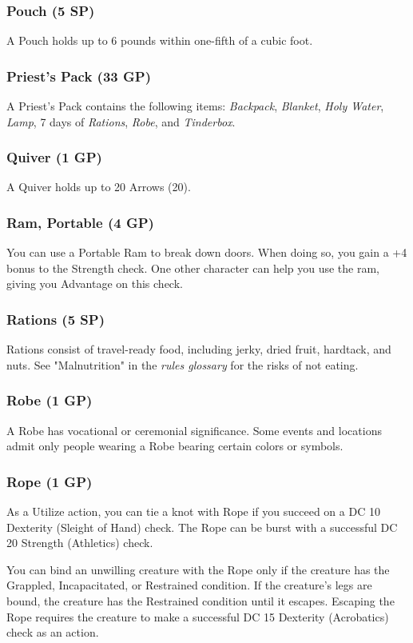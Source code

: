 \documentclass[10pt,a4paper,twoside,bg=print,twocolumn,openany,nodeprecatedcode]{dndbook}
\begin{document}
\subsubsection{Pouch (5 SP)}
A Pouch holds up to 6 pounds within one-fifth of a cubic foot.

\subsubsection{Priest's Pack (33 GP)}
A Priest's Pack contains the following items: \textit{Backpack}, \textit{Blanket}, \textit{Holy Water}, \textit{Lamp}, 7 days of \textit{Rations}, \textit{Robe}, and \textit{Tinderbox}.

\subsubsection{Quiver (1 GP)}
A Quiver holds up to 20 Arrows (20).

\subsubsection{Ram, Portable (4 GP)}
You can use a Portable Ram to break down doors. When doing so, you gain a +4 bonus to the Strength check. One other character can help you use the ram, giving you Advantage on this check.

\subsubsection{Rations (5 SP)}
Rations consist of travel-ready food, including jerky, dried fruit, hardtack, and nuts. See "Malnutrition" in the \textit{rules glossary} for the risks of not eating.

\subsubsection{Robe (1 GP)}
A Robe has vocational or ceremonial significance. Some events and locations admit only people wearing a Robe bearing certain colors or symbols.

\subsubsection{Rope (1 GP)}
As a Utilize action, you can tie a knot with Rope if you succeed on a DC 10 Dexterity (Sleight of Hand) check. The Rope can be burst with a successful DC 20 Strength (Athletics) check.

You can bind an unwilling creature with the Rope only if the creature has the Grappled, Incapacitated, or Restrained condition. If the creature's legs are bound, the creature has the Restrained condition until it escapes. Escaping the Rope requires the creature to make a successful DC 15 Dexterity (Acrobatics) check as an action.
\end{document}
